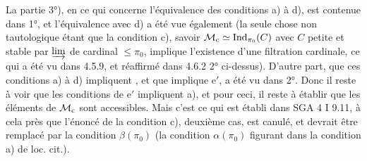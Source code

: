 La partie 3°), en ce qui concerne l'équivalence des conditions a) à d), est contenue dans 1°, et l'équivalence avec d) a été vue également (la seule chose non tautologique étant que la condition c), savoir $\mathcal{M}_{\mathrm{c}} \simeq \mathrm{Ind}_{\pi_0}(C)$ avec $C$ petite et stable par $\varinjlim$ de cardinal $\leqslant \pi_0$, implique l'existence d'une filtration cardinale, ce qui a été vu dans 4.5.9, et réaffirmé dans 4.6.2 2° ci-dessus). D'autre part, que ces conditions a) à d) impliquent  , et que  implique e$'$, a été vu dans 2°. Donc il reste à voir que les conditions de e$'$ impliquent a), et pour ceci, il reste à établir que les éléments de $\mathcal{M}_{\mathrm{c}}$ sont accessibles. Mais c'est ce qui est établi dans SGA 4 I 9.11, à cela près que l'énoncé de la condition c), deuxième cas, est canulé, et devrait être remplacé par la condition $\beta(\pi_0)$ (la condition $\alpha(\pi_0)$ figurant dans la condition a) de loc. cit.).


